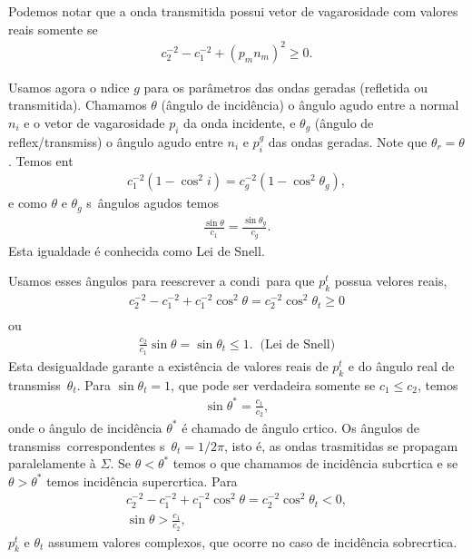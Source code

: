 Podemos notar que a onda transmitida possui vetor de vagarosidade com
valores reais somente se
\begin{eqnarray}
c_2^{-2} - c_1^{-2} + (p_m n_m)^2 \geq 0.
\end{eqnarray}

Usamos agora o \ih ndice $g$ para os par\^ametros das ondas geradas
(refletida ou transmitida). Chamamos $\theta$ (\^angulo de incid\^encia)
o \^angulo agudo entre a normal $n_i$ e o vetor de vagarosidade $p_i$ da
onda incidente, e $\theta_g$ (\^angulo de reflex\ao/transmiss\ao) o
\^angulo agudo entre $n_i$ e $p_i^g$ das ondas geradas. Note que
$\theta_r = \theta$. Temos ent\ao\
\begin{eqnarray}
c_1 ^{-2}(1 - \cos^2 i) = c_g^{-2}(1 - \cos^2 \theta_g),
\end{eqnarray}
e como $\theta$ e $\theta_g$ s\ao\ \^angulos agudos temos
\begin{eqnarray}
\frac{\sin \theta}{c_1} = \frac{\sin \theta_g}{c_g}.
\end{eqnarray}
Esta igualdade \'e conhecida como Lei de Snell.

Usamos esses \^angulos para reescrever a condi\cao\ para que $p_k^t$
possua velores reais,
\begin{eqnarray}
c_2^{-2} - c_1^{-2} + c_1^{-2}\cos^2 \theta = c_2^{-2}\cos^2 \theta_t \geq 0\\
\end{eqnarray}
ou
\begin{eqnarray}
\frac{c_2}{c_1}\sin \theta = \sin \theta_t \leq 1.\;\; \mbox{(Lei de Snell)}
\end{eqnarray}
Esta desigualdade garante a exist\^encia de valores reais de $p_k^t$ e
do \^angulo real de transmiss\ao\ $\theta_t$. Para $\sin \theta_t = 1$,
que pode ser verdadeira somente se $c_1 \leq c_2$, temos
\begin{eqnarray}
\sin \theta^{*} = \frac{c_1}{c_2},
\end{eqnarray}
onde o \^angulo de incid\^encia $\theta^{*}$ \'e chamado de \^angulo
cr\ih tico. Os \^angulos de transmiss\ao\ correspondentes s\ao\
$\theta_t = 1/2\pi$, isto \'e, as ondas trasmitidas se propagam
paralelamente \`a $\Sigma$. Se $\theta < \theta^{*}$ temos o que
chamamos de incid\^encia subcr\ih tica e se $\theta > \theta^{*}$ temos
incid\^encia supercr\ih tica. Para
\begin{eqnarray}
c_2^{-2} - c_1^{-2} + c_1^{-2}\cos^2 \theta = c_2^{-2}\cos^2 \theta_t < 0,\\
\sin \theta > \frac{c_1}{c_2},
\end{eqnarray}
$p_k^t$ e $\theta_t$ assumem valores complexos, que ocorre no caso de
incid\^encia sobrecr\ih tica.

